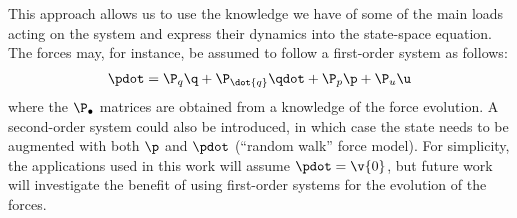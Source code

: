 \documentclass[wes, manuscript]{copernicus}
\begin{document}
This approach allows us to use the knowledge we have of some of the main loads acting on the system and express their dynamics into the state-space equation. The forces may, for instance, be assumed to follow a first-order system as follows:
    \begin{align}
       \pdot = \P_q \q + \P_{\dot{q}} \qdot  + \P_p \p + \P_u \u 
           \label{eq:FirstOrderP}
    \end{align}
where the $\P_\bullet$ matrices are obtained from a knowledge of the force evolution.
A second-order system could also be introduced, in which case the state needs to be augmented with both $\p$ and $\pdot$ (``random walk'' force model). For simplicity, the applications used in this work will assume $\pdot=\v{0}$, but future work will investigate the benefit of using first-order systems for the evolution of the forces.
\end{document}
